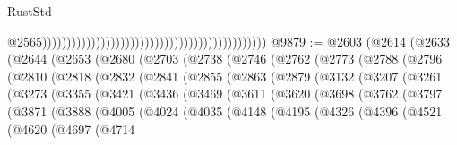 \begin{lexlean}{RustStd}
\begin{coremodule}
{\begin{coremodule}
{{{{{{{{{{{{{{{{{{{{{{{{{{{{{{{{{{{{{{{{{{{{{{{{{{{{{{{{{{{{{{{{{{{{{{{{{{{{{{                                                                                                @2565))))))))))))))))))))))))))))))))))))))))))))))
@9879 := @2603
    (@2614
      (@2633
        (@2644
          (@2653
            (@2680
              (@2703
                (@2738
                  (@2746
                    (@2762
                      (@2773
                        (@2788
                          (@2796
                            (@2810
                              (@2818
                                (@2832
                                  (@2841
                                    (@2855
                                      (@2863
                                        (@2879
                                          (@3132
                                            (@3207
                                              (@3261
                                                (@3273
                                                  (@3355
                                                    (@3421
                                                      (@3436
                                                        (@3469
                                                          (@3611
                                                            (@3620
                                                              (@3698
                                                                (@3762
                                                                  (@3797
                                                                    (@3871
                                                                      (@3888
                                                                        (@4005
                                                                          (@4024
                                                                            (@4035
                                                                              (@4148
                                                                                (@4195
                                                                                  (@4326
                                                                                    (@4396
                                                                                      (@4521
                                                                                        (@4620
                                                                                          (@4697
                                                                                            (@4714
}}}}}}}}}}}}}}}}}}}}}}}}}}}}}}}}}}}}}}}}}}}}}}}}}}}}}}}}}}}}}}}}}}}}}}}}}}}}}}
\end{coremodule}}
\end{coremodule}
\end{lexlean}
